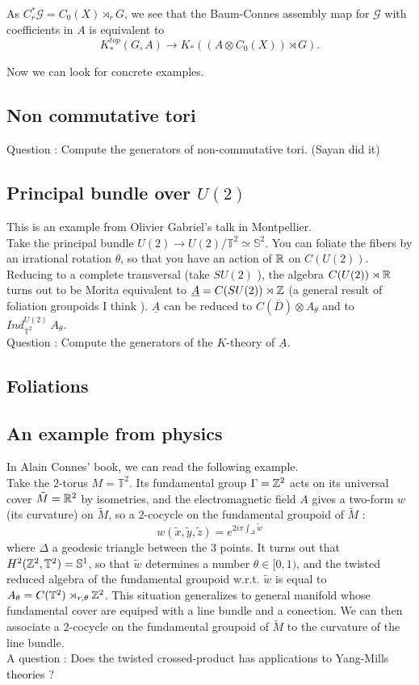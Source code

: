 As $C^*_r \mathcal G = C_0(X)\rtimes_r G$, we see that the Baum-Connes assembly map for $\mathcal G$ with coefficients in $A$ is equivalent to 
\[K_*^{top}(G,A)\rightarrow K_*((A\otimes C_0(X))\rtimes G).\]

Now we can look for concrete examples.
\subsection{Non commutative tori}

Question : Compute the generators of non-commutative tori. (Sayan did it)
\subsection{Principal bundle over $U(2)$}
This is an example from Olivier Gabriel's talk in Montpellier. \\

Take the principal bundle $U(2)\rightarrow U(2)/\mathbb T^2\simeq \mathbb S^2$. You can foliate the fibers by an irrational rotation $\theta$, so that you have an action of $\mathbb R$ on $C(U(2))$. Reducing to a complete transversal (take $SU(2)$ ), the algebra $C(U(2))\rtimes \mathbb R$ turns out to be Morita equivalent to $\underline A= C(SU(2))\rtimes \mathbb Z$ (a general result of foliation groupoids I think ). $\underline A$ can be reduced to $C(\overline D)\otimes A_\theta$ and to $Ind_{\mathbb T^2}^{U(2)}\ A_\theta$.\\

Question : Compute the generators of the $K$-theory of $\underline A$.

\subsection{Foliations}
\subsection{An example from physics}
In Alain Connes' book, we can read the following example.\\

Take the $2$-torus $M=\mathbb T^2$. Its fundamental group $\Gamma=\mathbb Z^2$ acts on its universal cover $\tilde M=\mathbb R^2$ by isometries, and the electromagnetic field $A$ gives a two-form $w$ (its curvature) on $\tilde M$, so a $2$-cocycle on the fundamental groupoid of $\tilde M$ :
\[w(\tilde x,\tilde y,\tilde z)=e^{2i\pi \int_{\Delta}\tilde w}\]
where $\Delta$ a geodesic triangle between the $3$ points. It turns out that $H^2(\mathbb Z^2,\mathbb T^2)=\mathbb S^1$, so that $\tilde w$ determines a number $\theta\in [0,1)$, and the twisted reduced algebra of the fundamental groupoid w.r.t. $\tilde w$ is equal to $A_\theta=C(\mathbb T^2 )\rtimes_{r,\theta} \mathbb Z^2$. This situation generalizes to general manifold whose fundamental cover are equiped with a line bundle and a conection. We can then associate a $2$-cocycle on the fundamental groupoid of $\tilde M$ to the curvature of the line bundle. \\

A question : Does the twisted crossed-product has applications to Yang-Mills theories ?
